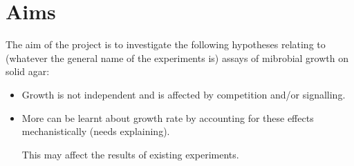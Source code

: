 
\section{Aims}
\label{sec:aims}

The aim of the project is to investigate the following hypotheses relating to (whatever the
general name of the experiments is) assays of mibrobial growth on
solid agar:
\begin{itemize}
\item Growth is not independent and is affected by competition and/or
  signalling.
\item More can be learnt about growth rate by accounting for these
  effects mechanistically (needs explaining).

This may affect the results of existing experiments.
\end{itemize}



